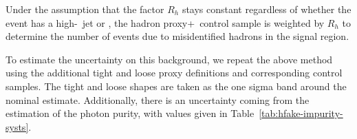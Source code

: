 Under the assumption that the factor $R_{h}$ stays constant regardless of whether the event has a high-\pt\ jet or \met, the hadron proxy+\met\ control sample is weighted by $R_{h}$ to determine the number of events due to misidentified hadrons in the signal region.

To estimate the uncertainty on this background, we repeat the above method using the additional tight and loose proxy definitions and corresponding control samples.
The tight and loose shapes are taken as the one sigma band around the nominal estimate. 
Additionally, there is an uncertainty coming from the estimation of the photon purity, with values given in Table~\ref{tab:hfake-impurity-systs}. 
